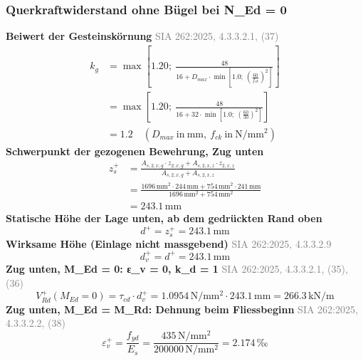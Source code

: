 \documentclass[11pt,a4paper]{article}
\newcommand{\normref}[1]{{\small\textcolor{gray}{#1}}}
\begin{document}
\subsubsection{Querkraftwiderstand ohne Bügel bei N\_Ed = 0}
\noindent\textbf{Beiwert der Gesteinskörnung} \hfill \normref{SIA 262:2025, 4.3.3.2.1, (37)}
\begin{equation*}
\begin{aligned}
  k_g &= \max\left[1.20;\ \frac{48}{16 + D_{max} \cdot \min\left[1.0;\ \left(\frac{60}{f_{ck}}\right)^{2}\right]}\right] \\
  &= \max\left[1.20;\ \frac{48}{16 + 32 \cdot \min\left[1.0;\ \left(\frac{60}{30}\right)^{2}\right]}\right] \\
  &= 1.2 \quad \left(D_{max}\ \text{in}\ \mathrm{mm},\ f_{ck}\ \text{in}\ \mathrm{N}/\mathrm{mm}^{2}\right)
\end{aligned}
\end{equation*}
\noindent\textbf{Schwerpunkt der gezogenen Bewehrung, Zug unten}
\begin{equation*}
\begin{aligned}
  z_s^{+} &= \frac{A_{s,2,x,g} \cdot z_{2,x,g} + A_{s,2,x,z} \cdot z_{2,x,z}}{A_{s,2,x,g} + A_{s,2,x,z}} \\
  &= \frac{1696\,\mathrm{mm}^{2} \cdot 244\,\mathrm{mm} + 754\,\mathrm{mm}^{2} \cdot 241\,\mathrm{mm}}{1696\,\mathrm{mm}^{2} + 754\,\mathrm{mm}^{2}} \\
  &= 243.1\,\mathrm{mm}
\end{aligned}
\end{equation*}
\noindent\textbf{Statische Höhe der Lage unten, ab dem gedrückten Rand oben}
\begin{equation*}
d^{+} = z_s^{+} = 243.1\,\mathrm{mm}
\end{equation*}
\noindent\textbf{Wirksame Höhe (Einlage nicht massgebend)} \hfill \normref{SIA 262:2025, 4.3.3.2.9}
\begin{equation*}
d_v^{+} = d^{+} = 243.1\,\mathrm{mm}
\end{equation*}
\noindent\textbf{Zug unten, M\_Ed = 0: ε\_v = 0, k\_d = 1} \hfill \normref{SIA 262:2025, 4.3.3.2.1, (35), (36)}
\begin{equation*}
V_{Rd}^{+}(M_{Ed} = 0) = \tau_{cd} \cdot d_v^{+} = 1.0954\,\mathrm{N}/\mathrm{mm}^{2} \cdot 243.1\,\mathrm{mm} = 266.3\,\mathrm{kN}/\mathrm{m}
\end{equation*}
\noindent\textbf{Zug unten, M\_Ed = M\_Rd: Dehnung beim Fliessbeginn} \hfill \normref{SIA 262:2025, 4.3.3.2.2, (38)}
\begin{equation*}
\varepsilon_v^{+} = \frac{f_{yd}}{E_s} = \frac{435\,\mathrm{N}/\mathrm{mm}^{2}}{200000\,\mathrm{N}/\mathrm{mm}^{2}} = 2.174\,\text{‰}
\end{equation*}
\end{document}
